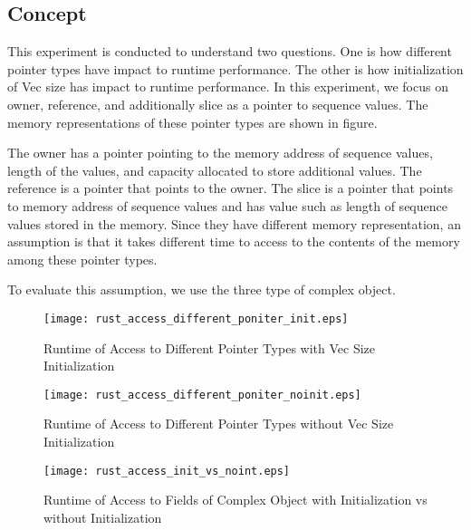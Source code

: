 \subsection{Concept}
This experiment is conducted to understand two questions. One is how different pointer types have impact to runtime performance.
The other is how initialization of Vec size has impact to runtime performance. 
In this experiment, we focus on owner, reference, and additionally slice as a pointer to sequence values. 
The memory representations of these pointer types are shown in figure. 

The owner has a pointer pointing to the memory address of sequence values, length of the values, and capacity allocated to store additional values. 
The reference is a pointer that points to the owner. The slice is a pointer that points to memory address of sequence values and has value such as length of 
sequence values stored in the memory. Since they have different memory representation, an assumption is that it takes different time to access to the contents of the memory among these pointer types.

To evaluate this assumption, we use the three type of complex object.

\begin{figure}[htb]
    \texttt{[image: rust\_access\_different\_poniter\_init.eps]}
    \caption{Runtime of Access to Different Pointer Types with Vec Size Initialization}
    \label{fig:rustaccessinit}
\end{figure}

\begin{figure}[htb]
    \texttt{[image: rust\_access\_different\_poniter\_noinit.eps]}
    \caption{Runtime of Access to Different Pointer Types without Vec Size Initialization}
    \label{fig:rustaccessnoinit}
\end{figure}

\begin{figure}[htb]
    \texttt{[image: rust\_access\_init\_vs\_noint.eps]}
    \caption{Runtime of Access to Fields of Complex Object with Initialization vs without Initialization}
    \label{fig:rustaccessnoinit}
\end{figure}



